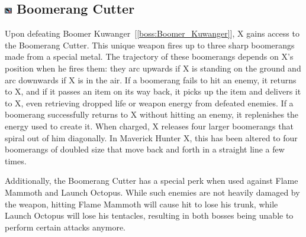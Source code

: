 \subsection{\includegraphics[width=12px, height=10px]{figures/X1/weapons/B_cutter.jpg} Boomerang Cutter}\label{Boomerang_cutter}

Upon defeating Boomer Kuwanger~[\ref{boss:Boomer_Kuwanger}], X gains access to the Boomerang Cutter. This unique weapon fires up to three sharp boomerangs~\cite{wiki:Boomerang_cutter} made from a special metal. The trajectory of these boomerangs depends on X's position when he fires them: they arc upwards if X is standing on the ground and arc downwards if X is in the air. If a boomerang fails to hit an enemy, it returns to X, and if it passes an item on its way back, it picks up the item and delivers it to X, even retrieving dropped life or weapon energy from defeated enemies. If a boomerang successfully returns to X without hitting an enemy, it replenishes the energy used to create it. When charged, X releases four larger boomerangs that spiral out of him diagonally. In Maverick Hunter X, this has been altered to four boomerangs of doubled size that move back and forth in a straight line a few times.

Additionally, the Boomerang Cutter has a special perk when used against Flame Mammoth and Launch Octopus. While such enemies are not heavily damaged by the weapon, hitting Flame Mammoth will cause hit to lose his trunk, while Launch Octopus will lose his tentacles, resulting in both bosses being unable to perform certain attacks anymore.

